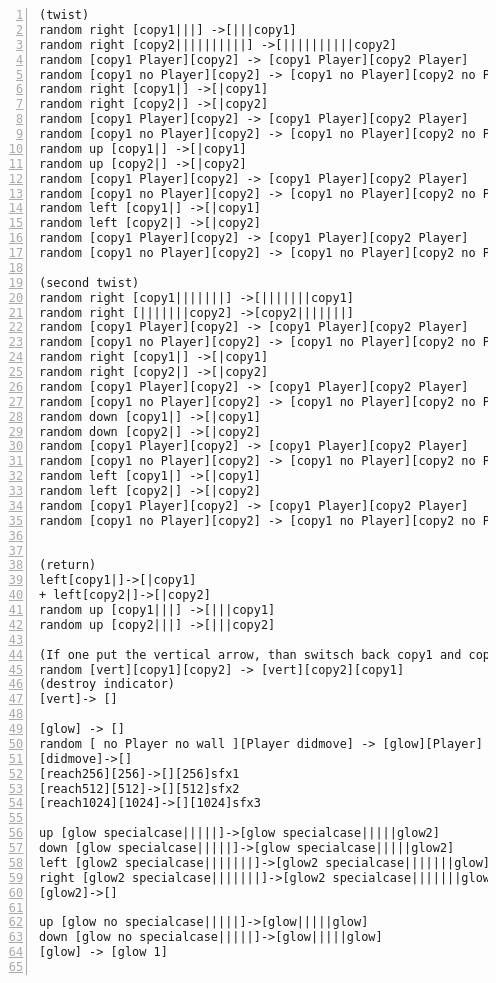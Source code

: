 \documentclass[11pt]{amsart}
\begin{document}
\begin{lstlisting}[numbers=left,numberstyle=\tiny,numbersep=10pt]
(twist)
random right [copy1|||] ->[|||copy1]
random right [copy2||||||||||] ->[||||||||||copy2]
random [copy1 Player][copy2] -> [copy1 Player][copy2 Player]
random [copy1 no Player][copy2] -> [copy1 no Player][copy2 no Player]
random right [copy1|] ->[|copy1]
random right [copy2|] ->[|copy2]
random [copy1 Player][copy2] -> [copy1 Player][copy2 Player]
random [copy1 no Player][copy2] -> [copy1 no Player][copy2 no Player]
random up [copy1|] ->[|copy1]
random up [copy2|] ->[|copy2]
random [copy1 Player][copy2] -> [copy1 Player][copy2 Player]
random [copy1 no Player][copy2] -> [copy1 no Player][copy2 no Player]
random left [copy1|] ->[|copy1]
random left [copy2|] ->[|copy2]
random [copy1 Player][copy2] -> [copy1 Player][copy2 Player]
random [copy1 no Player][copy2] -> [copy1 no Player][copy2 no Player]

(second twist)
random right [copy1|||||||] ->[|||||||copy1]
random right [|||||||copy2] ->[copy2|||||||]
random [copy1 Player][copy2] -> [copy1 Player][copy2 Player]
random [copy1 no Player][copy2] -> [copy1 no Player][copy2 no Player]
random right [copy1|] ->[|copy1]
random right [copy2|] ->[|copy2]
random [copy1 Player][copy2] -> [copy1 Player][copy2 Player]
random [copy1 no Player][copy2] -> [copy1 no Player][copy2 no Player]
random down [copy1|] ->[|copy1]
random down [copy2|] ->[|copy2]
random [copy1 Player][copy2] -> [copy1 Player][copy2 Player]
random [copy1 no Player][copy2] -> [copy1 no Player][copy2 no Player]
random left [copy1|] ->[|copy1]
random left [copy2|] ->[|copy2]
random [copy1 Player][copy2] -> [copy1 Player][copy2 Player]
random [copy1 no Player][copy2] -> [copy1 no Player][copy2 no Player]


(return)
left[copy1|]->[|copy1]
+ left[copy2|]->[|copy2]
random up [copy1|||] ->[|||copy1]
random up [copy2|||] ->[|||copy2]

(If one put the vertical arrow, than switsch back copy1 and copy2)
random [vert][copy1][copy2] -> [vert][copy2][copy1]
(destroy indicator)
[vert]-> []

[glow] -> []
random [ no Player no wall ][Player didmove] -> [glow][Player] sfx0
[didmove]->[]
[reach256][256]->[][256]sfx1
[reach512][512]->[][512]sfx2
[reach1024][1024]->[][1024]sfx3

up [glow specialcase|||||]->[glow specialcase|||||glow2]
down [glow specialcase|||||]->[glow specialcase|||||glow2]
left [glow2 specialcase|||||||]->[glow2 specialcase|||||||glow]
right [glow2 specialcase|||||||]->[glow2 specialcase|||||||glow]
[glow2]->[]

up [glow no specialcase|||||]->[glow|||||glow]
down [glow no specialcase|||||]->[glow|||||glow]
[glow] -> [glow 1]


\end{lstlisting}
\end{document}
